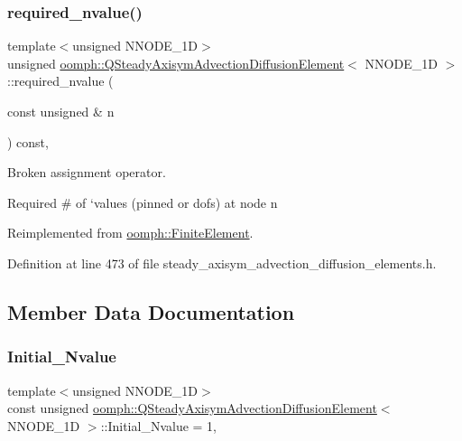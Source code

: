 \subsubsection{\texorpdfstring{required\+\_\+nvalue()}{required\_nvalue()}}
{\footnotesize\ttfamily template$<$unsigned N\+N\+O\+D\+E\+\_\+1D$>$ \\
unsigned \hyperlink{classoomph_1_1QSteadyAxisymAdvectionDiffusionElement}{oomph\+::\+Q\+Steady\+Axisym\+Advection\+Diffusion\+Element}$<$ N\+N\+O\+D\+E\+\_\+1D $>$\+::required\+\_\+nvalue (\begin{DoxyParamCaption}\item[{const unsigned \&}]{n }\end{DoxyParamCaption}) const\hspace{0.3cm}{\ttfamily [inline]}, {\ttfamily [virtual]}}



Broken assignment operator. 

Required \# of `values\textquotesingle{} (pinned or dofs) at node n 

Reimplemented from \hyperlink{classoomph_1_1FiniteElement_a56610c60d5bc2d7c27407a1455471b1a}{oomph\+::\+Finite\+Element}.



Definition at line 473 of file steady\+\_\+axisym\+\_\+advection\+\_\+diffusion\+\_\+elements.\+h.



\subsection{Member Data Documentation}
\mbox{\label{classoomph_1_1QSteadyAxisymAdvectionDiffusionElement_ab351f94c3f0203cf8102f02e0e882276}} 
\subsubsection{\texorpdfstring{Initial\+\_\+\+Nvalue}{Initial\_Nvalue}}
{\footnotesize\ttfamily template$<$unsigned N\+N\+O\+D\+E\+\_\+1D$>$ \\
const unsigned \hyperlink{classoomph_1_1QSteadyAxisymAdvectionDiffusionElement}{oomph\+::\+Q\+Steady\+Axisym\+Advection\+Diffusion\+Element}$<$ N\+N\+O\+D\+E\+\_\+1D $>$\+::Initial\+\_\+\+Nvalue = 1\hspace{0.3cm}{\ttfamily [static]}, {\ttfamily [private]}}



